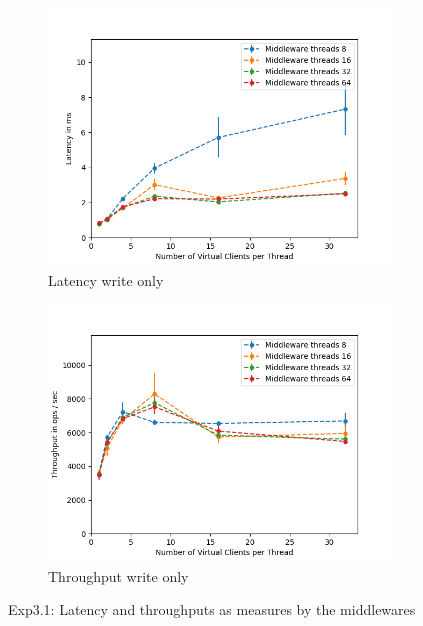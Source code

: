 \documentclass[11pt,a4paper]{article}
\begin{document}
\begin{figure}[H]
\centering
\begin{subfigure}{.5\textwidth}
    \centering
    \includegraphics[width=\textwidth]{img/exp3_1/exp3_1__latency_middleware_write_1.png}
    \caption{Latency write only}
    \label{fig:mesh1}
\end{subfigure}%
\begin{subfigure}{.5\textwidth}
      \centering
    \includegraphics[width=\textwidth]{img/exp3_1/exp3_1__throughput_middleware_write_1.png}
    \caption{Throughput write only}
    \label{fig:mesh1}
\end{subfigure}
\caption{Exp3.1: Latency and throughputs as measures by the middlewares}
\label{fig:test}
\end{figure}
\end{document}
